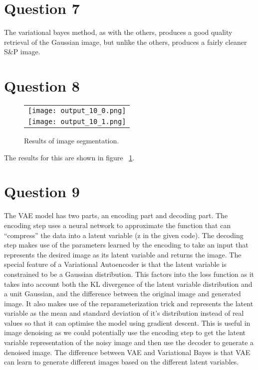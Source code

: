 \documentclass[]{article}
\begin{document}
    \section*{Question 7}
        \par The variational bayes method, as with the others, produces a good quality retrieval of the Gaussian image, but unlike the others, produces a fairly cleaner S\&P image.
    \section*{Question 8}
    \begin{figure}[h]
        \centering
        \begin{tabular}{c}
            \texttt{[image: output\_10\_0.png]}\\
            \texttt{[image: output\_10\_1.png]}
        \end{tabular}
        \caption{Results of image segmentation.}
        \label{fig:q8}
    \end{figure}
    \par The results for this are shown in figure ~\ref{fig:q8}.
    \section*{Question 9}
        \par The VAE model has two parts, an encoding part and decoding part. The encoding step uses a
        neural network to approximate the function that can “compress” the data into a latent variable (z
        in the given code). The decoding step makes use of the parameters learned by the encoding to take
        an input that represents the desired image as its latent variable and returns the image. The special
        feature of a Variational Autoencoder is that the latent variable is constrained to be a Gaussian
        distribution. This factors into the loss function as it takes into account both the KL divergence of the latent variable distribution and a unit Gaussian, and the difference between the original image
        and generated image. It also makes use of the reparameterization trick and represents the latent
        variable as the mean and standard deviation of it’s distribution instead of real values so that it
        can optimise the model using gradient descent. This is useful in image denoising as we could
        potentially use the encoding step to get the latent variable representation of the noisy image and
        then use the decoder to generate a denoised image. The difference between VAE and Variational
        Bayes is that VAE can learn to generate different images based on the different latent variables.
\end{document}
